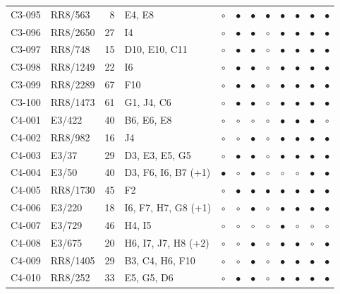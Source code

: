 {\begin{longtable}{llrp{3.9cm}cccccccc}
    C3-095 & RR8/563 & 8 & E4, E8 & $\circ$ & $\bullet$ & $\bullet$ & $\bullet$ & $\bullet$ & $\bullet$ & $\bullet$ & $\bullet$ \\
    C3-096 & RR8/2650 & 27 & I4 & $\circ$ & $\bullet$ & $\bullet$ & $\circ$ & $\bullet$ & $\bullet$ & $\bullet$ & $\bullet$ \\
    C3-097 & RR8/748 & 15 & D10, E10, C11 & $\circ$ & $\bullet$ & $\bullet$ & $\circ$ & $\bullet$ & $\bullet$ & $\bullet$ & $\bullet$ \\
    C3-098 & RR8/1249 & 22 & I6 & $\circ$ & $\bullet$ & $\bullet$ & $\circ$ & $\bullet$ & $\bullet$ & $\bullet$ & $\bullet$ \\
    C3-099 & RR8/2289 & 67 & F10 & $\circ$ & $\bullet$ & $\bullet$ & $\circ$ & $\bullet$ & $\bullet$ & $\bullet$ & $\bullet$ \\
    C3-100 & RR8/1473 & 61 & G1, J4, C6 & $\circ$ & $\bullet$ & $\bullet$ & $\circ$ & $\bullet$ & $\bullet$ & $\bullet$ & $\bullet$ \\
    C4-001 & E3/422 & 40 & B6, E6, E8 & $\circ$ & $\circ$ & $\circ$ & $\circ$ & $\bullet$ & $\bullet$ & $\bullet$ & $\circ$ \\
    C4-002 & RR8/982 & 16 & J4 & $\circ$ & $\circ$ & $\bullet$ & $\circ$ & $\bullet$ & $\bullet$ & $\bullet$ & $\bullet$ \\
    C4-003 & E3/37 & 29 & D3, E3, E5, G5 & $\circ$ & $\bullet$ & $\bullet$ & $\circ$ & $\bullet$ & $\bullet$ & $\bullet$ & $\bullet$ \\
    C4-004 & E3/50 & 40 & D3, F6, I6, B7 (+1) & $\bullet$ & $\circ$ & $\bullet$ & $\circ$ & $\circ$ & $\circ$ & $\bullet$ & $\bullet$ \\
    C4-005 & RR8/1730 & 45 & F2 & $\circ$ & $\bullet$ & $\bullet$ & $\bullet$ & $\bullet$ & $\bullet$ & $\bullet$ & $\bullet$ \\
    C4-006 & E3/220 & 18 & I6, F7, H7, G8 (+1) & $\circ$ & $\circ$ & $\bullet$ & $\circ$ & $\bullet$ & $\bullet$ & $\bullet$ & $\bullet$ \\
    C4-007 & E3/729 & 46 & H4, I5 & $\circ$ & $\circ$ & $\circ$ & $\circ$ & $\bullet$ & $\circ$ & $\circ$ & $\circ$ \\
    C4-008 & E3/675 & 20 & H6, I7, J7, H8 (+2) & $\circ$ & $\circ$ & $\bullet$ & $\circ$ & $\bullet$ & $\bullet$ & $\circ$ & $\bullet$ \\
    C4-009 & RR8/1405 & 29 & B3, C4, H6, F10 & $\circ$ & $\circ$ & $\bullet$ & $\circ$ & $\bullet$ & $\bullet$ & $\bullet$ & $\bullet$ \\
    C4-010 & RR8/252 & 33 & E5, G5, D6 & $\circ$ & $\bullet$ & $\bullet$ & $\circ$ & $\bullet$ & $\bullet$ & $\bullet$ & $\bullet$ \\

\end{longtable}}
